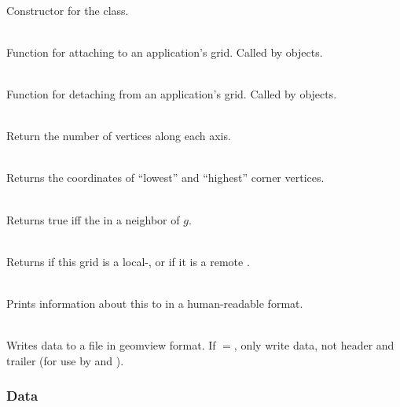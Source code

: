 \documentclass[11pt]{article}
\begin{document}
     \\
    Constructor for the  class.

     \\
    Function for attaching to an application's grid.  Called by
     objects.

     \\
    Function for detaching from an application's grid.  Called by
     objects.

     \\
    Return the number of vertices along each axis.

     \\ 
    Returns the coordinates of ``lowest'' and ``highest'' corner vertices.

     \\ 
    Returns true iff the  in a neighbor of  $g$.
    
     \\ Returns  if
    this grid is a local-, or  if it is a
    remote .

     \\
    Prints information about this  to  in
    a human-readable format.

     \\ Writes  data to a file in geomview
    format.  If $=$, only write data, not header
    and trailer (for use by  and
    ).

\subsubsection{ Data}

\end{document}
